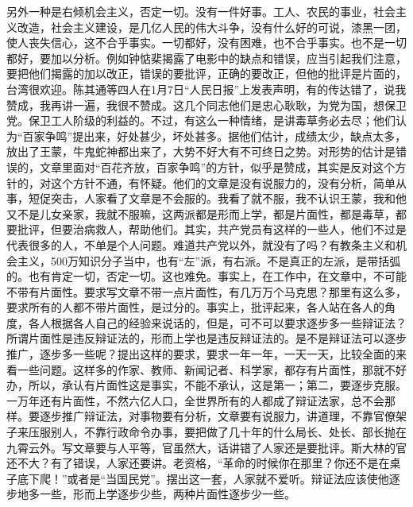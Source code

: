 另外一种是右倾机会主义，否定一切。没有一件好事。工人、农民的事业，社会主义改造，社会主义建设，是几亿人民的伟大斗争，没有什么好的可说，漆黑一团，使人丧失信心，这不合乎事实。一切都好，没有困难，也不合乎事实。也不是一切都好，要加以分析。例如钟惦棐揭露了电影中的缺点和错误，应当引起我们注意，要把他们揭露的加以改正，错误的要批评，正确的要改正，但他的批评是片面的，台湾很欢迎。陈其通等四人在1月7日“人民日报”上发表声明，有的传达错了，说我赞成，我再讲一遍，我很不赞成。这几个同志他们是忠心耿耿，为党为国，想保卫党。保卫工人阶级的利益的。不过，有这么一种情绪，是讲毒草务必去尽；他们认为“百家争鸣”提出来，好处甚少，坏处甚多。据他们估计，成绩太少，缺点太多，放出了王蒙，牛鬼蛇神都出来了，大势不好大有不可终日之势。对形势的估计是错误的，文章里面对“百花齐放，百家争鸣”的方针，似乎是赞成，其实是反对这个方针的，对这个方针不通，有怀疑。他们的文章是没有说服力的，没有分析，简单从事，短促突击，人家看了文章是不会服的。我看了就不服，我不认识王蒙，我和他又不是儿女亲家，我就不服嘛，这两派都是形而上学，都是片面性，都是毒草，都要批评，但要治病救人，帮助他们。其实，共产党员有这样的一些人，他们不过是代表很多的人，不单是个人问题。难道共产党以外，就没有了吗？有教条主义和机会主义，500万知识分子当中，也有“左”派，有右派。不是真正的左派，是带括弧的。也有肯定一切，否定一切。这也难免。事实上，在工作中，在文章中，不可能不带有片面性。要求写文章不带一点片面性，有几万万个马克思？那里有这么多，要求所有的人都不带片面性，是过分的。事实上，批评起来，各人站在各人的角度，各人根据各人自己的经验来说话的，但是，可不可以要求逐步多一些辩证法？所谓片面性是违反辩证法的，形而上学也是违反辩证法的。是不是辩证法可以逐步推广，逐步多一些呢？提出这样的要求，要求一年一年，一天一天，比较全面的来看一些问题。这样多的作家、教师、新闻记者、科学家，都存有片面性，那就不好办，所以，承认有片面性这是事实，不能不承认，这是第一；第二，要逐步克服。一万年还有片面性，不然六亿人口，全世界所有的人都成了辩证法家，总不会那样。要逐步推广辩证法，对事物要有分析，文章要有说服力，讲道理，不靠官僚架子来压服别人，不靠行政命令办事，要把做了几十年的什么局长、处长、部长抛在九霄云外。写文章要与人平等，官虽然大，话讲错了人家还是要批评。斯大林的官还不大？有了错误，人家还要讲。老资格，“革命的时候你在那里？你还不是在桌子底下爬！”或者是“当国民党”。摆出这一套，人家就不爱听。辩证法应该使他逐步地多一些，形而上学逐步少些，两种片面性逐步少一些。

